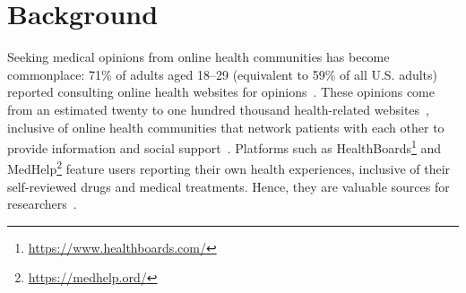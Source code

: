 \documentclass{bmcart}
\begin{document}



\section{Background}

Seeking medical opinions from online health communities has become commonplace: 71\% of adults aged 18--29 (equivalent to 59\% of all
U.S. adults) reported consulting online health
websites for opinions~\cite{fox2013health}.  These opinions come from an estimated
twenty to one hundred thousand health-related
websites~\cite{diaz2002patients}, inclusive of online health
communities that network patients with each other to provide
information and social support~\cite{johnston2013online}.  Platforms
such as
HealthBoards\footnote{\scriptsize{\url{https://www.healthboards.com/}}}
and MedHelp\footnote{{\scriptsize{\url{https://medhelp.ord/}}}}
feature users reporting their own health experiences, inclusive of
their self-reviewed drugs and medical treatments.  Hence, they are
valuable sources for researchers~\cite{leyens2017use,martin2014big}.
\end{document}
